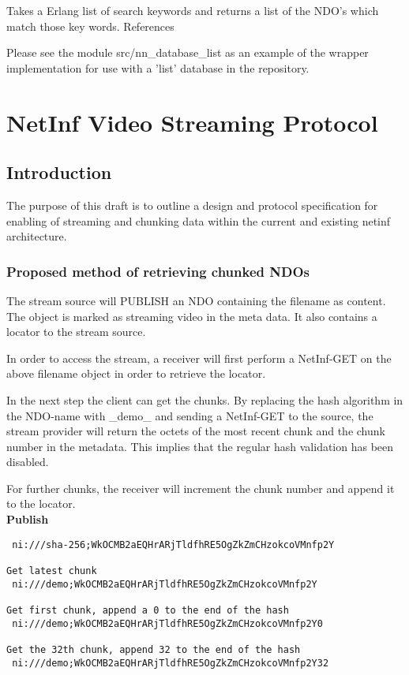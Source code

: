 \documentclass[11pt]{report}
\begin{document}
Takes a Erlang list of search keywords and returns a list of the NDO's which match those key words.
References

Please see the module src/nn\_database\_list as an example of the wrapper implementation for use with a 'list' database in the repository.



\section {NetInf Video Streaming Protocol}

\subsection{Introduction}

The purpose of this draft is to outline a design and protocol specification for enabling of streaming and chunking data within the current and existing netinf architecture.

\subsubsection{Proposed method of retrieving chunked NDOs}

The stream source will PUBLISH an NDO containing the filename as content. The object is marked as streaming video in the meta data. It also contains a locator to the stream source.

In order to access the stream, a receiver will first perform a NetInf-GET on the above filename object in order to retrieve the locator. 

In the next step the client can get the chunks. By replacing the hash algorithm in the NDO-name with \_demo\_ and sending a NetInf-GET to the source, the stream provider will return the octets of the most recent chunk and the chunk number in the metadata. This implies that the regular hash validation has been disabled.

For further chunks, the receiver will increment the chunk number and append it to the locator.\\

\textbf{Publish}\\
\begin{verbatim}
 ni:///sha-256;WkOCMB2aEQHrARjTldfhRE5OgZkZmCHzokcoVMnfp2Y

Get latest chunk
 ni:///demo;WkOCMB2aEQHrARjTldfhRE5OgZkZmCHzokcoVMnfp2Y

Get first chunk, append a 0 to the end of the hash
 ni:///demo;WkOCMB2aEQHrARjTldfhRE5OgZkZmCHzokcoVMnfp2Y0

Get the 32th chunk, append 32 to the end of the hash
 ni:///demo;WkOCMB2aEQHrARjTldfhRE5OgZkZmCHzokcoVMnfp2Y32
\end{verbatim}
 
\end{document}
